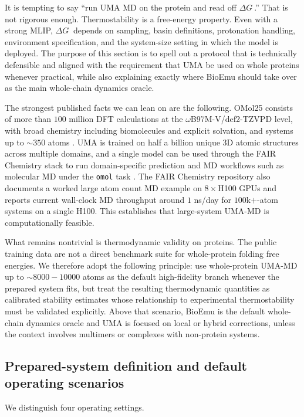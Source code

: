\documentclass[11pt]{article}
\newcommand{\dG}{\ensuremath{\Delta G \ }}
\begin{document}
It is tempting to say ``run UMA MD on the protein and read off $\dG$.'' That is not rigorous enough. Thermostability is a free-energy property. Even with a strong MLIP, $\dG$ depends on sampling, basin definitions, protonation handling, environment specification, and the system-size setting in which the model is deployed. The purpose of this section is to spell out a protocol that is technically defensible and aligned with the requirement that UMA be used on whole proteins whenever practical, while also explaining exactly where BioEmu should take over as the main whole-chain dynamics oracle.

The strongest published facts we can lean on are the following. OMol25 consists of more than $100$ million DFT calculations at the $\omega$B97M-V/def2-TZVPD level, with broad chemistry including biomolecules and explicit solvation, and systems up to $\sim 350$ atoms \citep{levine2025omol25}. UMA is trained on half a billion unique 3D atomic structures across multiple domains, and a single model can be used through the FAIR Chemistry stack to run domain-specific prediction and MD workflows such as molecular MD under the \texttt{omol} task \citep{wood2025uma,fairchem2025github}. The FAIR Chemistry repository also documents a worked large atom count MD example on $8\times$H100 GPUs and reports current wall-clock MD throughput around $1$ ns/day for $100$k$+$-atom systems \citep{fairchem2025github} on a single H100. This establishes that large-system UMA-MD is computationally feasible.

What remains nontrivial is thermodynamic validity on proteins. The public training data are not a direct benchmark suite for whole-protein folding free energies. We therefore adopt the following principle: use whole-protein UMA-MD up to $\sim 8000-10000$ atoms as the default high-fidelity branch whenever the prepared system fits, but treat the resulting thermodynamic quantities as calibrated stability estimates whose relationship to experimental thermostability must be validated explicitly. Above that scenario, BioEmu is the default whole-chain dynamics oracle and UMA is focused on local or hybrid corrections, unless the context involves multimers or complexes with non-protein systems.

\subsection{Prepared-system definition and default operating scenarios}

We distinguish four operating settings.
\end{document}
